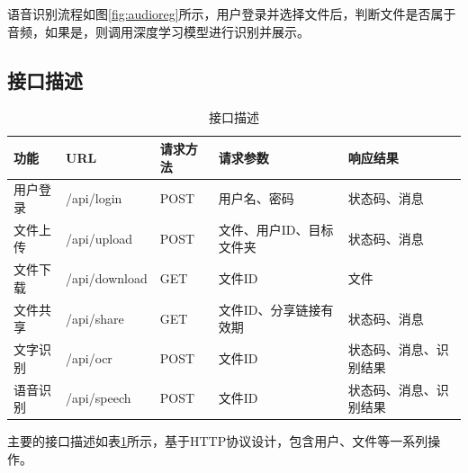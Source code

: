 语音识别流程如图\ref{fig:audioreg}所示，用户登录并选择文件后，判断文件是否属于音频，如果是，则调用深度学习模型进行识别并展示。

\subsection{接口描述}

\begin{table}[H]
    \centering
    \caption{接口描述}
    \label{table:api}
    {
        \begin{tabularx}{1.0\textwidth}{|p{1.5cm}|X|p{1.5cm}|X|X|}
            \hline
            功能 & URL & 请求方法 & 请求参数 & 响应结果 \\ 
            \hline
            用户登录 & /api/login & POST & 用户名、密码 & 状态码、消息 \\
            文件上传 & /api/upload & POST & 文件、用户ID、目标文件夹 & 状态码、消息 \\ 
            文件下载 & /api/download & GET & 文件ID & 文件 \\
            文件共享 & /api/share & GET & 文件ID、分享链接有效期 & 状态码、消息 \\
            文字识别 & /api/ocr & POST & 文件ID & 状态码、消息、识别结果 \\
            语音识别 & /api/speech & POST & 文件ID & 状态码、消息、识别结果 \\
            \hline
        \end{tabularx}
    }
\end{table}

主要的接口描述如表\ref{table:api}所示，基于HTTP协议设计，包含用户、文件等一系列操作。